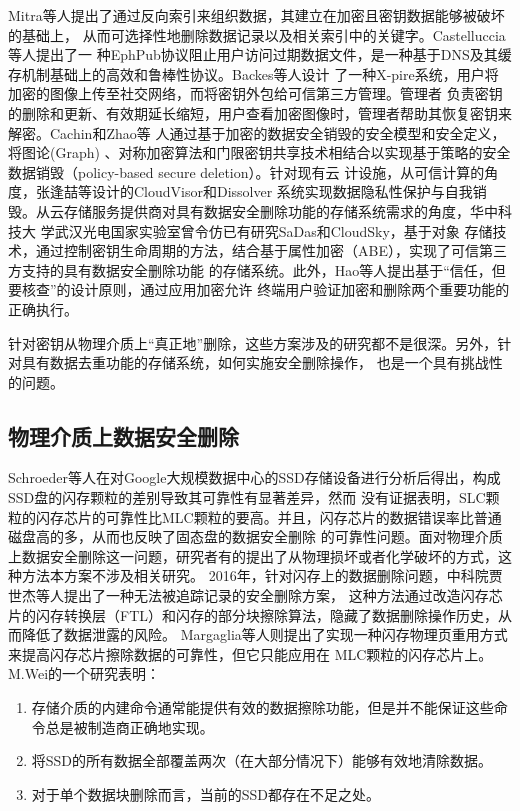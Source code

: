 Mitra等人\cite{Mitra2006Secure}提出了通过反向索引来组织数据，其建立在加密且密钥数据能够被破坏的基础上，
从而可选择性地删除数据记录以及相关索引中的关键字。Castelluccia等人\cite{Castelluccia2011EphPub}提出了一
种EphPub协议阻止用户访问过期数据文件，是一种基于DNS及其缓存机制基础上的高效和鲁棒性协议。Backes等人设计
了一种X-pire系统\cite{Backes2011X}，用户将加密的图像上传至社交网络，而将密钥外包给可信第三方管理。管理者
负责密钥的删除和更新、有效期延长缩短，用户查看加密图像时，管理者帮助其恢复密钥来解密。Cachin和Zhao等
人\cite{Cachin2013Policy,Zhao2015Gracewipe}通过基于加密的数据安全销毁的安全模型和安全定义，将图论(Graph)
、对称加密算法和门限密钥共享技术相结合以实现基于策略的安全数据销毁（policy-based secure deletion）。针对现有云
计设施，从可信计算的角度，张逢喆等设计的CloudVisor\cite{Zhang2011CloudVisor}和Dissolver\cite{张逢喆2011云计算中的数据隐私性保护与自我销毁}
系统实现数据隐私性保护与自我销毁。从云存储服务提供商对具有数据安全删除功能的存储系统需求的角度，华中科技大
学武汉光电国家实验室曾令仿已有研究SaDas\cite{Zeng2013SeDas}和CloudSky\cite{Zeng2015CloudSky}，基于对象
存储技术，通过控制密钥生命周期的方法，结合基于属性加密（ABE），实现了可信第三方支持的具有数据安全删除功能
的存储系统。此外，Hao等人\cite{Feng2016Deleting}提出基于“信任，但要核查”的设计原则，通过应用加密允许
终端用户验证加密和删除两个重要功能的正确执行。

针对密钥从物理介质上“真正地”删除，这些方案涉及的研究都不是很深。另外，针对具有数据去重功能的存储系统，如何实施安全删除操作，
也是一个具有挑战性的问题。
\subsection{物理介质上数据安全删除}
Schroeder等人\cite{Schroeder2016Flash}在对Google大规模数据中心的SSD存储设备进行分析后得出，构成SSD盘的闪存颗粒的差别导致其可靠性有显著差异，然而
没有证据表明，SLC颗粒的闪存芯片的可靠性比MLC颗粒的要高。并且，闪存芯片的数据错误率比普通磁盘高的多，从而也反映了固态盘的数据安全删除
的可靠性问题。面对物理介质上数据安全删除这一问题，研究者有的提出了从物理损坏或者化学破坏的方式，这种方法本方案不涉及相关研究。
2016年，针对闪存上的数据删除问题，中科院贾世杰等人提出了一种无法被追踪记录的安全删除方案\cite{Jia2016NFPS}，
这种方法通过改造闪存芯片的闪存转换层（FTL）和闪存的部分块擦除算法，隐藏了数据删除操作历史，从而降低了数据泄露的风险。
Margaglia等人\cite{Margaglia2016The}则提出了实现一种闪存物理页重用方式来提高闪存芯片擦除数据的可靠性，但它只能应用在
MLC颗粒的闪存芯片上。
M.Wei的一个研究\cite{Wei2011Reliably}表明：
\begin{enumerate}
\item 存储介质的内建命令通常能提供有效的数据擦除功能，但是并不能保证这些命令总是被制造商正确地实现。
\item 将SSD的所有数据全部覆盖两次（在大部分情况下）能够有效地清除数据。
\item 对于单个数据块删除而言，当前的SSD都存在不足之处。
\end{enumerate}


